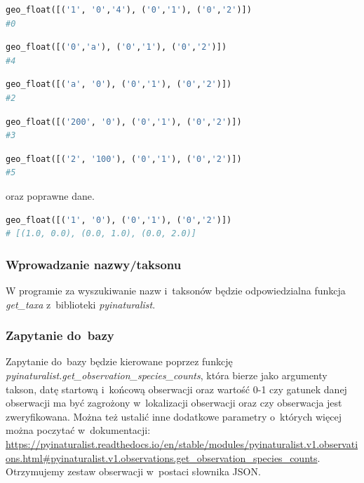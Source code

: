 \documentclass{article}
\begin{document}
\begin{itemize}
\begin{lstlisting}[language=Python, caption=za długa krotka]
geo_float([('1', '0','4'), ('0','1'), ('0','2')])
#0
\end{lstlisting}
\begin{lstlisting}[language=Python, caption=inne znaki]
geo_float([('0','a'), ('0','1'), ('0','2')])
#4
\end{lstlisting}
\begin{lstlisting}[language=Python, caption=inne znaki]
geo_float([('a', '0'), ('0','1'), ('0','2')])
#2
\end{lstlisting}
\begin{lstlisting}[language=Python, caption=liczby poza skalą]
geo_float([('200', '0'), ('0','1'), ('0','2')])
#3
\end{lstlisting}
\begin{lstlisting}[language=Python, caption=liczby poza skalą]
geo_float([('2', '100'), ('0','1'), ('0','2')])
#5
\end{lstlisting}
oraz poprawne dane.
\begin{lstlisting}[language=Python, caption=poprawne dane]
geo_float([('1', '0'), ('0','1'), ('0','2')])
# [(1.0, 0.0), (0.0, 1.0), (0.0, 2.0)]
\end{lstlisting}
\end{itemize}

\subsubsection{Wprowadzanie nazwy/taksonu}
W programie za wyszukiwanie nazw i~taksonów będzie odpowiedzialna funkcja \textit{get\_taxa} z~biblioteki \textit{pyinaturalist}.

\subsubsection{Zapytanie do~bazy}
Zapytanie do~bazy będzie kierowane poprzez funkcję \textit{pyinaturalist.get\_observation\_species\_counts}, która bierze jako argumenty takson, datę startową i~końcową obserwacji oraz wartość 0-1 czy gatunek danej obserwacji ma być zagrożony w~lokalizacji obserwacji oraz czy obserwacja jest zweryfikowana. Można też ustalić inne dodatkowe parametry o~których więcej można poczytać w~dokumentacji: \url{https://pyinaturalist.readthedocs.io/en/stable/modules/pyinaturalist.v1.observations.html#pyinaturalist.v1.observations.get_observation_species_counts}. Otrzymujemy zestaw obserwacji w~postaci słownika JSON.
\end{document}
